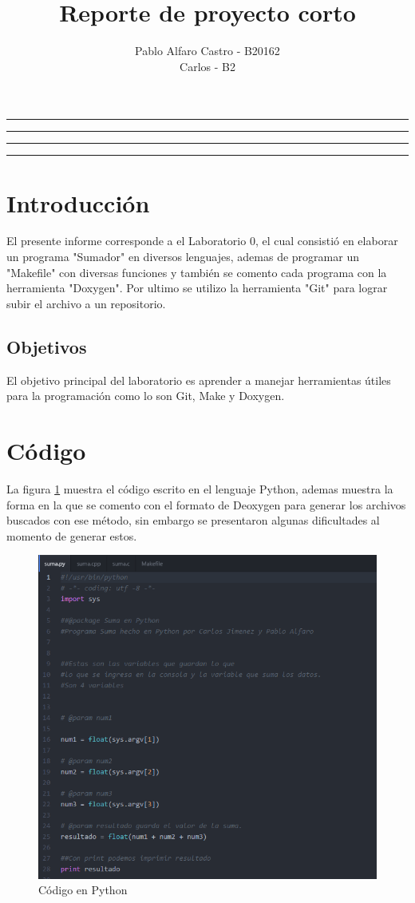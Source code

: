 \documentclass[11pt]{article}
\title{Reporte de proyecto corto}
\author{Pablo Alfaro Castro - B20162\\Carlos - B2}
\begin{document}
\maketitle
\hrule
\hrule
\tableofcontents
\hspace{5mm}
\hrule
\hrule


\section{Introducción}

El presente informe corresponde a el Laboratorio 0, el cual consistió en elaborar un programa "Sumador" en diversos lenguajes, ademas de programar un "Makefile" con diversas funciones y también se comento cada programa con la herramienta "Doxygen". Por ultimo se utilizo la herramienta "Git" para lograr subir el archivo a un repositorio.

\subsection{Objetivos}
El objetivo principal del laboratorio es aprender a manejar herramientas útiles para la programación como lo son Git, Make y Doxygen.



\section*{Código}

La figura \ref{fig:py} muestra el código escrito en el lenguaje Python, ademas muestra la forma en la que se comento con el formato de Deoxygen para generar los archivos buscados con ese método, sin embargo se presentaron algunas dificultades al momento de generar estos.

\begin{figure}[H]
\centering
\includegraphics[scale=0.8]{img/py.png}
\caption{Código en Python}
\label{fig:py}
\end{figure}
\newpage
\end{document}
